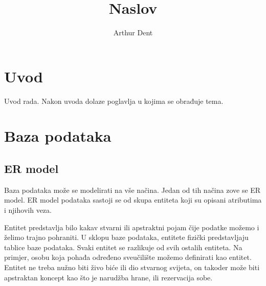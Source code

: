\documentclass[times, utf8, zavrsni]{fer}
\begin{document}

\title{Naslov}

\author{Arthur Dent}

\maketitle

\izvornik

\zahvala{}

\tableofcontents

\chapter{Uvod}
Uvod rada. Nakon uvoda dolaze poglavlja u kojima se obrađuje tema.

\chapter{Baza podataka}

\section{ER model}

Baza podataka može se modelirati na vše načina. Jedan od tih načina zove se ER model. ER model podataka sastoji se od skupa entiteta koji su opisani atributima i njihovih veza. 

Entitet predstavlja bilo kakav stvarni ili apstraktni pojam čije podatke možemo i želimo trajno pohraniti. U sklopu baze podataka, entitete fizički predstavljaju tablice baze podataka. Svaki entitet se razlikuje od svih ostalih entiteta. Na primjer, osobu koja pohađa određeno sveučilište možemo definirati kao entitet. Entitet ne treba nužno biti živo biće ili dio stvarnog svijeta, on takoder može biti apstraktan koncept kao što je narudžba hrane, ili rezervacija sobe. 
\end{document}
